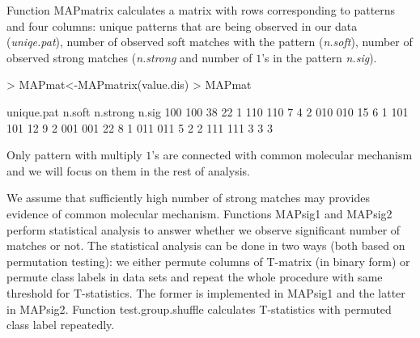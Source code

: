 \documentclass[a4paper]{report}
\begin{document}
Function {\ttfamily MAPmatrix} calculates a matrix with rows corresponding to patterns and four columns: unique patterns that are being observed in our data (\emph{uniqe.pat}), number of observed soft matches with the pattern (\emph{n.soft}), number of observed strong matches (\emph{n.strong} and number of $1$'s in the pattern \emph{n.sig}).
\begin{Schunk}
\begin{Sinput}
> MAPmat<-MAPmatrix(value.dis)
> MAPmat
\end{Sinput}
\begin{Soutput}
    unique.pat n.soft n.strong n.sig
100        100     38       22     1
110        110      7        4     2
010        010     15        6     1
101        101     12        9     2
001        001     22        8     1
011        011      5        2     2
111        111      3        3     3
\end{Soutput}
\end{Schunk}
Only pattern with multiply $1$'s are connected with common molecular mechanism and we will focus on them in the rest of analysis.
\begin{Schunk}
\end{Schunk}
We assume that sufficiently high number of strong matches may provides evidence of common molecular mechanism. Functions {\ttfamily MAPsig1} and {\ttfamily MAPsig2} perform statistical analysis to answer whether we observe significant number of matches or not. The statistical analysis can be done in two ways (both based on permutation testing): we either permute columns of T-matrix (in binary form) or permute class labels in data sets and repeat the whole procedure with same threshold for T-statistics. The former is implemented in {\ttfamily MAPsig1} and the latter in {\ttfamily MAPsig2}. Function {\ttfamily test.group.shuffle} calculates T-statistics with permuted class label repeatedly. 
\end{document}
